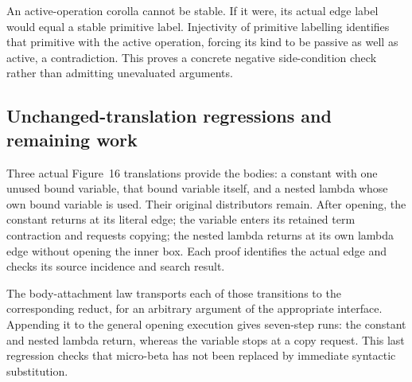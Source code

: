



An active-operation corolla cannot be stable. If it were, its actual
edge label would equal a stable primitive label. Injectivity of primitive
labelling identifies that primitive with the active operation, forcing its
kind to be passive as well as active, a contradiction. This proves a concrete
negative side-condition check rather than admitting unevaluated arguments.


\subsection{Unchanged-translation regressions and remaining work}

Three actual Figure~16 translations provide the bodies: a constant with
one unused bound variable, that bound variable itself, and a nested lambda
whose own bound variable is used. Their original distributors remain.
After opening, the constant returns at its literal edge; the variable enters
its retained term contraction and requests copying; the nested lambda returns
at its own lambda edge without opening the inner box. Each proof identifies
the actual edge and checks its source incidence and search result.







The body-attachment law transports each of those transitions to the
corresponding reduct, for an arbitrary argument of the appropriate interface.
Appending it to the general opening execution gives seven-step runs: the
constant and nested lambda return, whereas the variable stops at a copy
request. This last regression checks that micro-beta has not been replaced
by immediate syntactic substitution.

